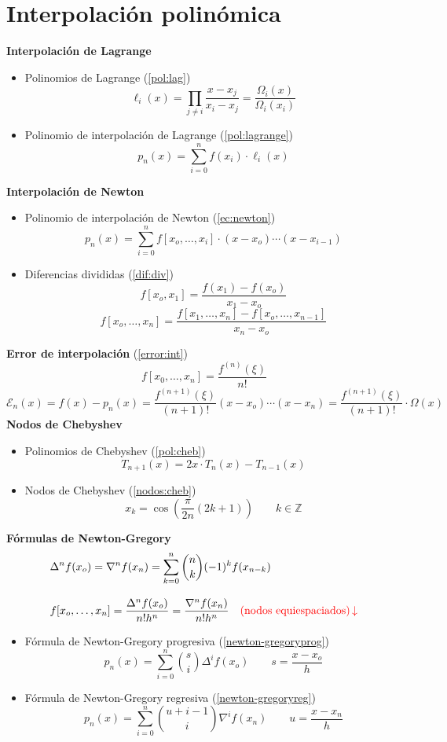 \section*{Interpolación polinómica}
\noindent\textbf{Interpolación de Lagrange}
\begin{itemize}
    \item Polinomios de Lagrange (\ref{pol:lag})
$$\ell_i(x)=\prod_{j\neq i}\dfrac{x-x_j}{x_i-x_j} = \dfrac{\Omega_i(x)}{\Omega_i(x_i)}$$
  \item Polinomio de interpolación de Lagrange (\ref{pol:lagrange})
  $$p_n(x)=\sum_{i=0}^nf(x_i)\cdot\ell_i(x) $$
\end{itemize}
\textbf{Interpolación de Newton}
\begin{itemize}
    \item Polinomio de interpolación de Newton (\ref{ec:newton})
    $$p_n(x)=\sum_{i=0}^nf[x_o,\ldots,x_i]\cdot (x-x_o)\cdots(x-x_{i-1})$$
    \item Diferencias divididas (\ref{dif:div})
    $$f[x_o,x_1]=\frac{f(x_1)-f(x_o)}{x_1-x_o}$$
    $$f[x_o,\ldots,x_n]=\frac{f[x_1,\ldots,x_n]-f[x_o,\ldots,x_{n-1}]}{x_n-x_o} $$
\end{itemize}
\textbf{Error de interpolación} (\ref{error:int})
    $$f[x_0,\dots,x_n] = \dfrac{f^{(n)}(\xi)}{n!}$$  $$\mathcal{E}_n(x)=f(x)-p_n(x)=\frac{f^{(n+1)}(\xi)}{(n+1)!}(x-x_o)\cdots(x-x_n) = \frac{f^{(n+1)}(\xi)}{(n+1)!}\cdot \Omega(x)$$
\textbf{Nodos de Chebyshev}
\begin{itemize}
    \item Polinomios de Chebyshev (\ref{pol:cheb})
    $$T_{n+1}(x)=2x\cdot T_{n}(x)-T_{n-1}(x)$$
    \item Nodos de Chebyshev (\ref{nodos:cheb})
    $$x_k=\cos\left(\dfrac{\pi}{2n}(2k+1)\right)\qquad k\in\mathbb{Z}$$
\end{itemize}
\textbf{Fórmulas de Newton-Gregory}
\begin{equation*}
    \begin{aligned}
        & \Delta^n f(x_o)=\nabla ^n f(x_n)=\sum_{k=0}^n \binom{n}{k} (-1)^k f(x_{n-k})\\[3mm]
        & f[x_o,\ldots,x_n]=\frac{\Delta^n f(x_o)}{n! h^n}=\frac{\nabla^n f(x_n)}{n! h^n} \quad \text{\textcolor{red}{(nodos equiespaciados)}}\,\textcolor{red}{\downarrow}
    \end{aligned}
\end{equation*}
\begin{itemize}
    \item Fórmula de Newton-Gregory progresiva (\ref{newton-gregoryprog})
    $$p_n(x)=\sum_{i=0}^n \binom{s}{i}\Delta^if(x_o)\qquad s=\dfrac{x-x_o}{h}$$
    \item Fórmula de Newton-Gregory regresiva (\ref{newton-gregoryreg})
    $$p_n(x)=\sum_{i=0}^n \binom{u+i-1}{i}\nabla^if(x_n)\qquad u=\dfrac{x-x_n}{h}$$
    \end{itemize}
